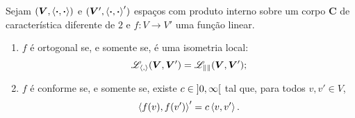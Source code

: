 \begin{proposition}
Sejam $(\bm V,\left\langle{\bm{\cdot}},{\bm{\cdot}}\right\rangle)$ e $(\bm V',\left\langle{\bm{\cdot}},{\bm{\cdot}}\right\rangle')$ espaços com produto interno sobre um corpo $\bm C$ de característica diferente de $2$ e $f\colon V \to V'$ uma função linear.
	\begin{enumerate}
	\item $f$ é ortogonal se, e somente se, é uma isometria local:
		\begin{equation*}
		\mathscr{L}_{\left\langle{},{}\right\rangle}(\bm V,\bm V') = \mathscr{L}_{\left\Vert{}\right\Vert}(\bm V,\bm V');
		\end{equation*}
	\item $f$ é conforme se, e somente se, existe $c \in \left]0,\allowbreak \infty\right[$ tal que, para todos $v,v' \in V$,
		\begin{equation*}
		\left\langle{f(v)},{f(v')}\right\rangle' = c\left\langle{v},{v'}\right\rangle.
		\end{equation*}
	\end{enumerate}
\end{proposition}
